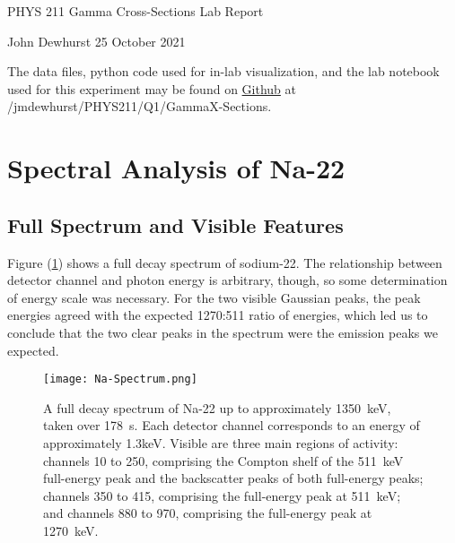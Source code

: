 \documentclass[letter]{article}
\begin{document}

\begin{center}
	{\large PHYS 211 Gamma Cross-Sections Lab Report}
	
	John Dewhurst \hspace{1cm}
	25 October 2021
	
	\vspace{1em}
	
	The data files, python code used for in-lab visualization, and the lab notebook used for this experiment may be found on \href{https://github.com/jmdewhurst/PHYS211.git}{Github} at /jmdewhurst/PHYS211/Q1/GammaX-Sections.
	
	\vspace{1em}
\end{center}
	


\section{Spectral Analysis of Na-22}

\subsection{Full Spectrum and Visible Features}


Figure (\ref{fig:NaFullSpec}) shows a full decay spectrum of sodium-22. The relationship between detector channel and photon energy is arbitrary, though, so some determination of energy scale was necessary. For the two visible Gaussian peaks, the peak energies agreed with the expected 1270:511 ratio of energies, which led us to conclude that the two clear peaks in the spectrum were the emission peaks we expected.

\begin{figure}[h] \centering
    \texttt{[image: Na-Spectrum.png]}
    \caption{A full decay spectrum of Na-22 up to approximately \qty{1350}{\kilo\electronvolt}, taken over \qty{178}{\second}. Each detector channel corresponds to an energy of approximately 1.3keV. Visible are three main regions of activity: channels 10 to 250, comprising the Compton shelf of the \qty{511}{\kilo\electronvolt} full-energy peak and the backscatter peaks of both full-energy peaks; channels 350 to 415, comprising the full-energy peak at \qty{511}{\kilo\electronvolt}; and channels 880 to 970, comprising the full-energy peak at \qty{1270}{\kilo\electronvolt}.}
    \label{fig:NaFullSpec}
\end{figure}
\end{document}
